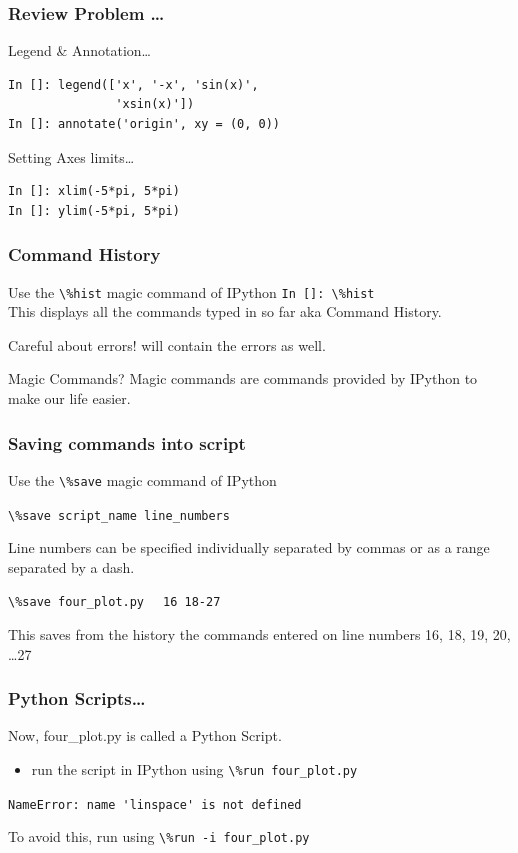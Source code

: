 \documentclass[14pt,compress]{beamer}
\newcommand{\typ}[1]{\lstinline{#1}}
\newcommand{\kwrd}[1]{ \texttt{\textbf{\color{blue}{#1}}}  }
\begin{document}
\begin{frame}[fragile]
\frametitle{Review Problem \ldots}
\alert{Legend \& Annotation\ldots}
\begin{lstlisting}
In []: legend(['x', '-x', 'sin(x)', 
               'xsin(x)'])
In []: annotate('origin', xy = (0, 0))
\end{lstlisting}
\alert{Setting Axes limits\ldots}
\begin{lstlisting}
In []: xlim(-5*pi, 5*pi)
In []: ylim(-5*pi, 5*pi)
\end{lstlisting}
\end{frame}

\begin{frame}[fragile]
\frametitle{Command History}
Use the \typ{\%hist} \alert{magic} command of IPython 
\typ{In []: \%hist}\\
This displays all the commands typed in so far aka Command History.
\begin{block}{Careful about errors!}
  \kwrd{\%hist} will contain the errors as well.\\
\end{block}
\begin{block}{Magic Commands?}
  Magic commands are commands provided by IPython to make our life easier.
\end{block}
\end{frame}

\begin{frame}[fragile]
  \frametitle{Saving commands into script}
Use the \typ{\%save} \alert{magic} command of IPython
\begin{block}{}
\typ{\%save script_name line_numbers}
\end{block}
Line numbers can be specified individually separated by commas or as a range separated by a dash.\\
\begin{block}{}
\typ{\%save four_plot.py} \alert{\typ{  16 18-27}} \\  
\end{block}
This saves from the history the commands entered on line numbers \alert{16, 18, 19, 20, \ldots 27}
\end{frame}

\begin{frame}
\frametitle{Python Scripts\ldots}
Now, four\_plot.py is called a Python Script.
 \begin{itemize}
 \item run the script in IPython using \typ{\%run four_plot.py}\\
 \end{itemize}
\pause
\alert{\typ{NameError: name 'linspace' is not defined}}
\begin{block}{}
To avoid this, run using \alert{\typ{\%run -i four_plot.py}}\\
\end{block}
\end{frame}
\end{document}
